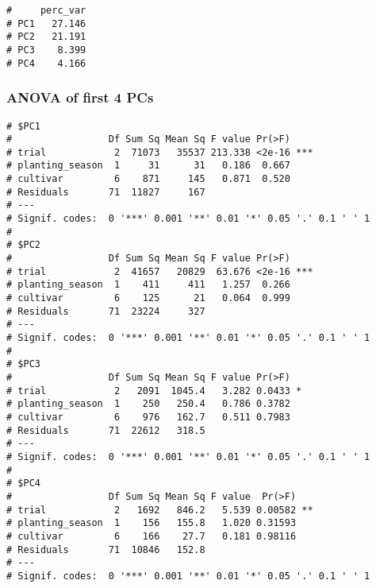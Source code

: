 \documentclass[
]{article}
\newenvironment{Shaded}{\begin{snugshade}}{\end{snugshade}}
\newcommand{\AttributeTok}[1]{\textcolor[rgb]{0.77,0.63,0.00}{#1}}
\newcommand{\ControlFlowTok}[1]{\textcolor[rgb]{0.13,0.29,0.53}{\textbf{#1}}}
\newcommand{\DecValTok}[1]{\textcolor[rgb]{0.00,0.00,0.81}{#1}}
\newcommand{\FunctionTok}[1]{\textcolor[rgb]{0.00,0.00,0.00}{#1}}
\newcommand{\NormalTok}[1]{#1}
\newcommand{\OtherTok}[1]{\textcolor[rgb]{0.56,0.35,0.01}{#1}}
\newcommand{\SpecialCharTok}[1]{\textcolor[rgb]{0.00,0.00,0.00}{#1}}
\begin{document}
\begin{verbatim}
#     perc_var
# PC1   27.146
# PC2   21.191
# PC3    8.399
# PC4    4.166
\end{verbatim}

\hypertarget{anova-of-first-4-pcs}{%
\subsubsection{ANOVA of first 4 PCs}\label{anova-of-first-4-pcs}}

\begin{Shaded}
\end{Shaded}

\begin{verbatim}
# $PC1
#                 Df Sum Sq Mean Sq F value Pr(>F)    
# trial            2  71073   35537 213.338 <2e-16 ***
# planting_season  1     31      31   0.186  0.667    
# cultivar         6    871     145   0.871  0.520    
# Residuals       71  11827     167                   
# ---
# Signif. codes:  0 '***' 0.001 '**' 0.01 '*' 0.05 '.' 0.1 ' ' 1
# 
# $PC2
#                 Df Sum Sq Mean Sq F value Pr(>F)    
# trial            2  41657   20829  63.676 <2e-16 ***
# planting_season  1    411     411   1.257  0.266    
# cultivar         6    125      21   0.064  0.999    
# Residuals       71  23224     327                   
# ---
# Signif. codes:  0 '***' 0.001 '**' 0.01 '*' 0.05 '.' 0.1 ' ' 1
# 
# $PC3
#                 Df Sum Sq Mean Sq F value Pr(>F)  
# trial            2   2091  1045.4   3.282 0.0433 *
# planting_season  1    250   250.4   0.786 0.3782  
# cultivar         6    976   162.7   0.511 0.7983  
# Residuals       71  22612   318.5                 
# ---
# Signif. codes:  0 '***' 0.001 '**' 0.01 '*' 0.05 '.' 0.1 ' ' 1
# 
# $PC4
#                 Df Sum Sq Mean Sq F value  Pr(>F)   
# trial            2   1692   846.2   5.539 0.00582 **
# planting_season  1    156   155.8   1.020 0.31593   
# cultivar         6    166    27.7   0.181 0.98116   
# Residuals       71  10846   152.8                   
# ---
# Signif. codes:  0 '***' 0.001 '**' 0.01 '*' 0.05 '.' 0.1 ' ' 1
\end{verbatim}
\end{document}
